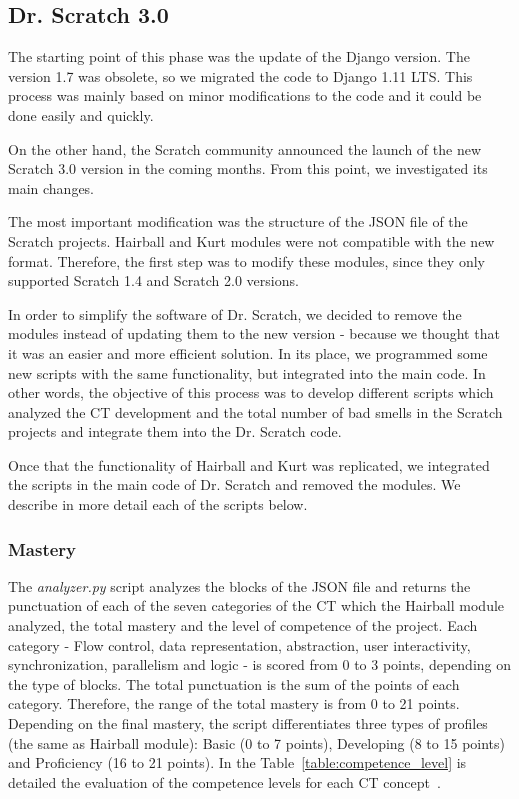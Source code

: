 \subsection{Dr. Scratch 3.0}
\label{subsec:newversion}

The starting point of this phase was the update of the Django version. The version 1.7 was obsolete, so we migrated the code to Django 1.11 LTS. This process was mainly based on minor modifications to the code and it could be done easily and quickly.

On the other hand, the Scratch community announced the launch of the new Scratch 3.0 version in the coming months. From this point, we investigated its main changes. 

The most important modification was the structure of the JSON file of the Scratch projects. Hairball and Kurt modules were not compatible with the new format. Therefore, the first step was to modify these modules, since they only supported Scratch 1.4 and Scratch 2.0 versions. 

In order to simplify the software of Dr. Scratch, we decided to remove the modules instead of updating them to the new version - because we thought that it was an easier and more efficient solution. In its place, we programmed some new scripts with the same functionality, but integrated into the main code. In other words, the objective of this process was to develop different scripts which analyzed the CT development and the total number of bad smells in the Scratch projects and integrate them into the Dr. Scratch code.

Once that the functionality of Hairball and Kurt was replicated, we integrated the scripts in the main code of Dr. Scratch and removed the modules. We describe in more detail each of the scripts below. 

\subsubsection{Mastery}
\label{subsubsec:mastery}

The \textit{analyzer.py} script analyzes the blocks of the JSON file and returns the punctuation of each of the seven categories of the CT which the Hairball module analyzed, the total mastery and the level of competence of the project. Each category - Flow control, data representation, abstraction, user interactivity, synchronization, parallelism and logic - is scored from 0 to 3 points, depending on the type of blocks. The total punctuation is the sum of the points of each category. Therefore, the range of the total mastery is from 0 to 21 points. Depending on the final mastery, the script differentiates three types of profiles (the same as Hairball module): Basic (0 to 7 points), Developing (8 to 15 points) and Proficiency (16 to 21 points). In the Table~\ref{table:competence_level} is detailed the evaluation of the competence levels for each CT concept~\cite{moreno2015dr}.

